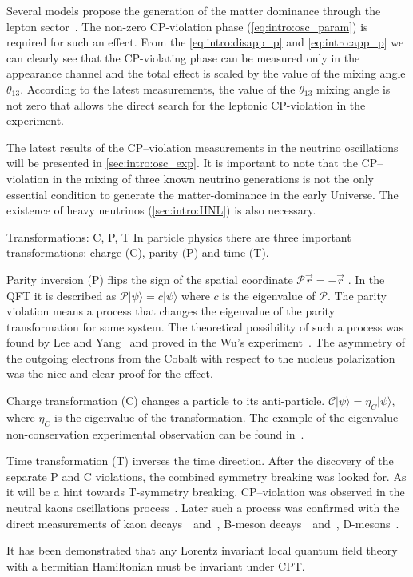 \documentclass[../main.tex]{subfiles}
\begin{document}
Several models propose the generation of the matter dominance through the lepton sector~\cite{Davidson2008}. The non-zero CP-violation phase (\autoref{eq:intro:osc_param}) is required for such an effect. From the \autoref{eq:intro:disapp_p} and \autoref{eq:intro:app_p} we can clearly see that the CP-violating phase can be measured only in the appearance channel and the total effect is scaled by the value of the mixing angle $\theta_{13}$. According to the latest measurements, the value of the $\theta_{13}$ mixing angle is not zero that allows the direct search for the leptonic CP-violation in the experiment.

The latest results of the CP--violation measurements in the neutrino oscillations will be presented in \autoref{sec:intro:osc_exp}. It is important to note that the CP--violation in the mixing of three known neutrino generations is not the only essential condition to generate the matter-dominance in the early Universe. The existence of heavy neutrinos (\autoref{sec:intro:HNL}) is also necessary.

\begin{bclogo}[couleur=blue!2, arrondi=0.1, logo=\bcinfo, nobreak=true]{Transformations: C, P, T}
In particle physics there are three important transformations: charge (C), parity (P) and time (T).

Parity inversion (P) flips the sign of the spatial coordinate $\mathcal{P}\overrightarrow{r}=-\overrightarrow{r}$ . In the QFT it is described as $\mathcal{P}\lvert\psi\rangle=c\lvert\psi\rangle$ where $c$ is the eigenvalue of $\mathcal{P}$. The parity violation means a process that changes the eigenvalue of the parity transformation for some system. The theoretical possibility of such a process was found by Lee and Yang~\cite{Lee1956} and proved in the Wu's experiment~\cite{Wu1957}. The asymmetry of the outgoing electrons from the Cobalt with respect to the nucleus polarization was the nice and clear proof for the effect.

Charge transformation (C) changes a particle to its anti-particle. $\mathcal{C}\lvert\psi\rangle=\eta_{C}\lvert\bar{\psi}\rangle$, where $\eta_{C}$ is the eigenvalue of the transformation. The example of the eigenvalue non-conservation experimental observation can be found in~\cite{Gormley1968}.

Time transformation (T) inverses the time direction. After the discovery of the separate P and C violations, the combined symmetry breaking was looked for. As it will be a hint towards T-symmetry breaking. CP--violation was observed in the neutral kaons oscillations process~\cite{Christenson1964}. Later such a process was confirmed with the direct measurements of kaon decays~\cite{Alavi-Harati1999}~and~\cite{Fanti1999}, B-meson decays~\cite{Aubert2001}~and~\cite{Abe2001}, D-mesons~\cite{Aaij2019}.

It has been demonstrated that any Lorentz invariant local quantum field theory with a hermitian Hamiltonian must be invariant under CPT.
\end{bclogo}
\end{document}
